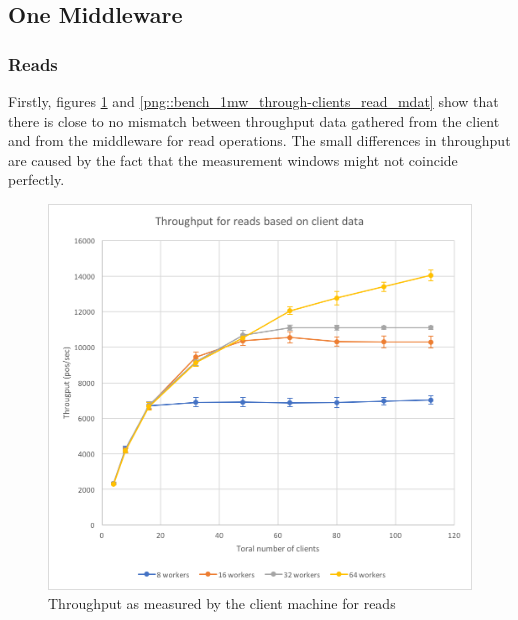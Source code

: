 \documentclass[11pt,a4paper]{article}
\begin{document}
\subsection{One Middleware}
\subsubsection{Reads}
Firstly, figures \ref{png::bench_1mw_through-clients_read_cdat} and \ref{png::bench_1mw_through-clients_read_mdat} show that there is close to no mismatch between throughput data gathered from the client and from the middleware for read operations. The small differences in throughput are caused by the fact that the measurement windows might not coincide perfectly.

\begin{figure}[!h]
    \centering
    \begin{minipage}[b]{.45\textwidth}
        \centering
        \includegraphics[width=\textwidth]{processing/graphics/bench_1mw_through-clients_read_cdat.png}
        \caption{Throughput as measured by the client machine for reads}
        \label{png::bench_1mw_through-clients_read_cdat}
    \end{minipage}
    \qquad
    \begin{minipage}[b]{.45\textwidth}
        \centering

\end{minipage}
\end{figure}
\end{document}

